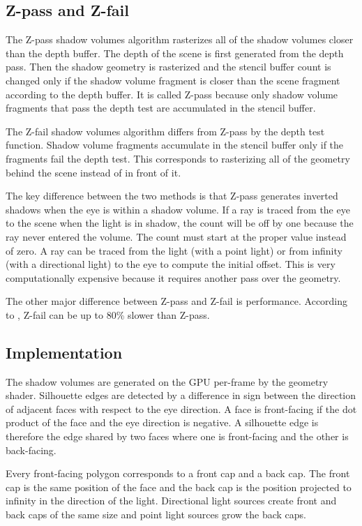 \documentclass[12pt]{article}
\begin{document}
\subsection{Z-pass and Z-fail}

The Z-pass shadow volumes algorithm rasterizes all of the shadow volumes closer than the depth buffer. The depth of the scene is first generated from the depth pass. Then the shadow geometry is rasterized and the stencil buffer count is changed only if the shadow volume fragment is closer than the scene fragment according to the depth buffer.
It is called Z-pass because only shadow volume fragments that pass the depth test are accumulated in the stencil buffer.

The Z-fail shadow volumes algorithm differs from Z-pass by the depth test function. Shadow volume fragments accumulate in the stencil buffer only if the fragments fail the depth test. This corresponds to rasterizing all of the geometry behind the scene instead of in front of it.

The key difference between the two methods is that Z-pass generates inverted shadows when the eye is within a shadow volume. If a ray is traced from the eye to the scene when the light is in shadow, the count will be off by one because the ray never entered the volume. The count must start at the proper value instead of zero.
A ray can be traced from the light (with a point light) or from infinity (with a directional light) to the eye to compute the initial offset.
This is very computationally expensive because it requires another pass over the geometry.

The other major difference between Z-pass and Z-fail is performance. According to \cite{Sen:2003:SSM:882262.882301}, Z-fail can be up to 80\% slower than Z-pass.

\subsection{Implementation}

The shadow volumes are generated on the GPU per-frame by the geometry shader. Silhouette edges are detected by a difference in sign between the direction of adjacent faces with respect to the eye direction.
A face is front-facing if the dot product of the face and the eye direction is negative. A silhouette edge is therefore the edge shared by two faces where one is front-facing and the other is back-facing.

Every front-facing polygon corresponds to a front cap and a back cap. The front cap is the same position of the face and the back cap is the position projected to infinity in the direction of the light. Directional light sources create front and back caps of the same size and point light sources grow the back caps.
\end{document}
